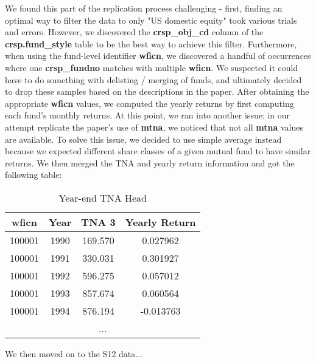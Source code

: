 \documentclass{article}
\begin{document}
We found this part of the replication process challenging - first, finding an optimal way to filter the data to only "US domestic equity" took various trials and errors. However, we discovered the \textbf{crsp\_obj\_cd} column of the \textbf{crsp.fund\_style} table to be the best way to achieve this filter. Furthermore, when using the fund-level identifier \textbf{wficn}, we discovered a handful of occurrences where one \textbf{crsp\_fundno} matches with multiple \textbf{wficn}. We suspected it could have to do something with delisting / merging of funds, and ultimately decided to drop these samples based on the descriptions in the paper. After obtaining the appropriate \textbf{wficn} values, we computed the yearly returns by first computing each fund's monthly returns. At this point, we ran into another issue: in our attempt replicate the paper's use of \textbf{mtna}, we noticed that not all \textbf{mtna} values are available. To solve this issue, we decided to use simple average instead because we expected different share classes of a given mutual fund to have similar returns. We then merged the TNA and yearly return information and got the following table: 

\begin{table}[ht]
\centering
\begin{tabular}{cccc}
wficn & Year & TNA 3 & Yearly Return \\
\hline
100001 & 1990 & 169.570 & 0.027962 \\
100001 & 1991 & 330.031 & 0.301927 \\
100001 & 1992 & 596.275 & 0.057012 \\
100001 & 1993 & 857.674 & 0.060564 \\
100001 & 1994 & 876.194 & -0.013763 \\
\multicolumn{4}{c}{...} 
\end{tabular}
\caption{Year-end TNA Head}
\label{Table-a}
\end{table}

We then moved on to the S12 data...
\end{document}
